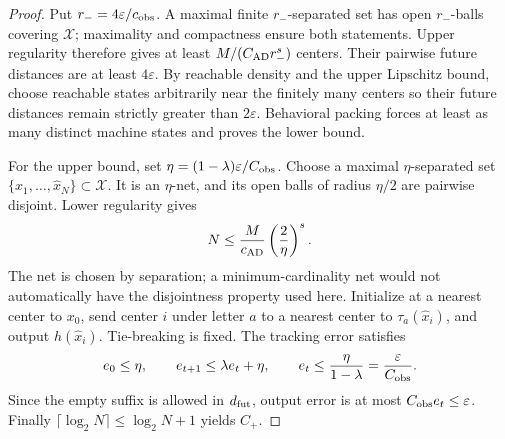 \begin{proof}
Put $r_-=4\varepsilon/c_{\rm obs}$. A maximal finite
$r_-$-separated set has open $r_-$-balls covering $\mathcal X$;
maximality and compactness ensure both statements. Upper regularity
therefore gives at least
$M/(C_{\rm AD}r_-^s)$ centers. Their pairwise future distances are
at least $4\varepsilon$. By reachable density and the upper
Lipschitz bound, choose reachable states arbitrarily near the finitely
many centers so their future distances remain strictly greater than
$2\varepsilon$. Behavioral packing forces at least as many distinct
machine states and proves the lower bound.

For the upper bound, set
$\eta=(1-\lambda)\varepsilon/C_{\rm obs}$.
Choose a maximal $\eta$-separated set
$\{\widehat x_1,\ldots,\widehat x_N\}\subset\mathcal X$.
It is an $\eta$-net, and its open balls of radius $\eta/2$ are
pairwise disjoint. Lower regularity gives
\[
 N\le\frac{M}{c_{\rm AD}}
                   \left(\frac2\eta\right)^s.
\]
The net is chosen by separation; a minimum-cardinality net would not
automatically have the disjointness property used here.
Initialize at a nearest center to $x_0$, send center $i$ under letter
$a$ to a nearest center to $\tau_a(\widehat x_i)$, and output
$h(\widehat x_i)$. Tie-breaking is fixed. The tracking error satisfies
\[
 e_0\le\eta,\qquad e_{t+1}\le\lambda e_t+\eta,
 \qquad e_t\le\frac\eta{1-\lambda}
                          =\frac\varepsilon{C_{\rm obs}}.
\]
Since the empty suffix is allowed in $d_{\rm fut}$, output error is
at most $C_{\rm obs}e_t\le\varepsilon$. Finally
$\lceil\log_2N\rceil\le\log_2N+1$ yields $C_+$.
\end{proof}
